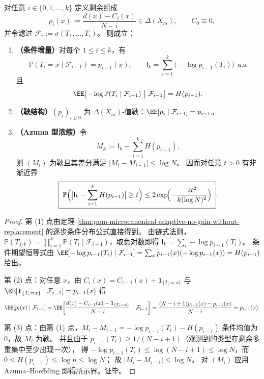 \begin{theorem}\label{thm:pom-microcanonical-information-doob}
对任意 \(i\in\{0,1,\dots,k\}\) 定义剩余组成
\[
p_i(x):=\frac{d(x)-C_i(x)}{N-i}\in\Delta(X_m),
\qquad C_0\equiv 0,
\]
并令滤过 \(\mathcal F_i:=\sigma(T_1,\dots,T_i)\)。
则成立：
\begin{enumerate}
  \item \textbf{（条件增量）}对每个 \(1\le i\le k\)，有
  \[
  \mathbb{P}(T_i=x\mid \mathcal F_{i-1})=p_{i-1}(x),
  \qquad
  \mathsf{I}_k=\sum_{i=1}^k\bigl(-\log p_{i-1}(T_i)\bigr)\ \ \text{a.s.}
  \]
  且
  \[
  \EE\!\left[-\log\mathbb{P}(T_i\mid\mathcal F_{i-1})\ \big|\ \mathcal F_{i-1}\right]=H(p_{i-1}).
  \]
  \item \textbf{（鞅结构）}\((p_i)_{i\ge 0}\) 为 \(\Delta(X_m)\)-值鞅：\(\EE[p_i\mid\mathcal F_{i-1}]=p_{i-1}\)。
  \item \textbf{（Azuma 型浓缩）}令
  \[
  M_k:=\mathsf{I}_k-\sum_{i=1}^k H(p_{i-1}),
  \]
  则 \((M_i)\) 为鞅且其差分满足 \(|M_i-M_{i-1}|\le \log N\)。
  因而对任意 \(t>0\) 有非渐近界
  \[
  \boxed{\;
  \mathbb{P}\Bigl(\bigl|\mathsf{I}_k-\sum_{i=1}^k H(p_{i-1})\bigr|\ge t\Bigr)
  \le 2\exp\!\Bigl(-\frac{2t^2}{k(\log N)^2}\Bigr)\; } .
  \]
\end{enumerate}
\end{theorem}
\begin{proof}
第 (1) 点由定理 \ref{thm:pom-microcanonical-adaptive-no-gain-without-replacement} 的逐步条件分布公式直接得到。
由链式法则，
\(
\mathbb{P}(T_{1:k})=\prod_{i=1}^k\mathbb{P}(T_i\mid\mathcal F_{i-1})
\)，取负对数即得 \(\mathsf{I}_k=\sum_i -\log p_{i-1}(T_i)\)。
条件期望恒等式由
\(
\EE[-\log p_{i-1}(T_i)\mid\mathcal F_{i-1}]
=\sum_x p_{i-1}(x)(-\log p_{i-1}(x))
=H(p_{i-1})
\)
给出。
\par
第 (2) 点：对任意 \(x\)，由 \(C_i(x)=C_{i-1}(x)+\mathbf{1}_{\{T_i=x\}}\) 与
\(\EE[\mathbf{1}_{\{T_i=x\}}\mid\mathcal F_{i-1}]=p_{i-1}(x)\) 得
\[
\EE[p_i(x)\mid\mathcal F_{i-1}]
=\EE\!\left[\frac{d(x)-C_{i-1}(x)-\mathbf{1}_{\{T_i=x\}}}{N-i}\ \Big|\ \mathcal F_{i-1}\right]
=\frac{(N-i+1)p_{i-1}(x)-p_{i-1}(x)}{N-i}
=p_{i-1}(x).
\]
\par
第 (3) 点：由第 (1) 点，\(M_i-M_{i-1}=-\log p_{i-1}(T_i)-H(p_{i-1})\) 条件均值为 \(0\)，故 \(M_i\) 为鞅。
并且由于 \(p_{i-1}(T_i)\ge 1/(N-i+1)\)（观测到的类型在剩余多重集中至少出现一次），
得 \(-\log p_{i-1}(T_i)\le \log(N-i+1)\le \log N\)，而 \(0\le H(p_{i-1})\le \log n\le \log N\)；
故 \(|M_i-M_{i-1}|\le \log N\)。
对 \((M_i)\) 应用 Azuma--Hoeffding 即得所示界。证毕。
\end{proof}

